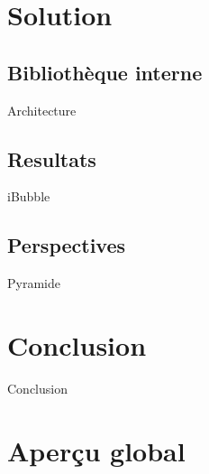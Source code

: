 \documentclass{bredelebeamer}
\begin{document}
\section{Solution}
	\subsection{Bibliothèque interne}

\begin{frame}{Architecture}
\end{frame}

	\subsection{Resultats}
\begin{frame}{iBubble}
\end{frame}

	\subsection{Perspectives}
\begin{frame}{Pyramide}
\end{frame}




\section{Conclusion}

\begin{frame}{Conclusion}
\end{frame}



\section{Aperçu global}
\end{document}

